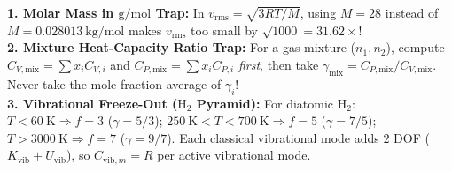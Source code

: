 \begin{quicksheet}
\begin{trapbox}
\footnotesize
\textbf{1. Molar Mass in $\si{\gram\per\mole}$ Trap:} In $v_{\mathrm{rms}} = \sqrt{3RT/M}$, using $M = 28$ instead of $M = \SI{0.028013}{\kilogram\per\mole}$ makes $v_{\mathrm{rms}}$ too small by $\sqrt{1000} = 31.62\times$!\\
\textbf{2. Mixture Heat-Capacity Ratio Trap:} For a gas mixture ($n_1, n_2$), compute $C_{V,\mathrm{mix}} = \sum x_i C_{V,i}$ and $C_{P,\mathrm{mix}} = \sum x_i C_{P,i}$ \emph{first}, then take $\gamma_{\mathrm{mix}} = C_{P,\mathrm{mix}}/C_{V,\mathrm{mix}}$. Never take the mole-fraction average of $\gamma_i$!\\
\textbf{3. Vibrational Freeze-Out ($\mathrm{H_2}$ Pyramid):} For diatomic $\mathrm{H_2}$: $T < \SI{60}{\kelvin} \Rightarrow f=3$ ($\gamma = 5/3$); $\SI{250}{\kelvin} < T < \SI{700}{\kelvin} \Rightarrow f=5$ ($\gamma = 7/5$); $T > \SI{3000}{\kelvin} \Rightarrow f=7$ ($\gamma = 9/7$). Each classical vibrational mode adds $2$ DOF ($K_{\mathrm{vib}} + U_{\mathrm{vib}}$), so $C_{\mathrm{vib},m} = R$ per active vibrational mode.
\end{trapbox}
\end{quicksheet}

